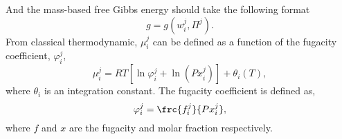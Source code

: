 And the mass-based free Gibbs energy should take the following format
\begin{displaymath}
g = g\left(w_{i}^{j},\Pi^{j}\right).
\end{displaymath}
From classical thermodynamic, $\mu_{i}^{j}$ can be defined as a function of the fugacity coefficient, $\varphi_{i}^{j}$,
\begin{equation}
\mu_{i}^{j}= R T\left[\ln\varphi_{i}^{j} + \ln\left(P x_{i}^{j}\right)\right] + \theta_{i}\left(T\right),
\end{equation}
where $\theta_{i}$ is an integration constant. The fugacity coefficient is defined as,
\begin{equation}
\varphi_{i}^{j} = \frc{f_{i}^{j}}{P x_{i}^{j}},
\end{equation}
where $f$ and $x$ are the fugacity and molar fraction respectively.



